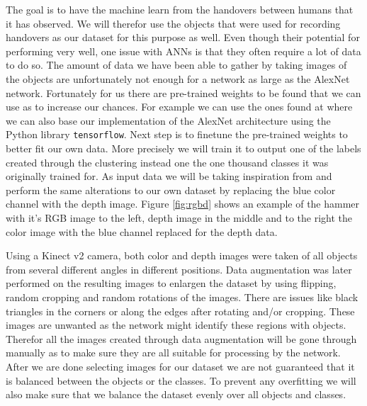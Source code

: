 The goal is to have the machine learn from the handovers between humans that it has observed. We will therefor use the objects that were used for recording handovers as our dataset for this purpose as well. Even though their potential for performing very well, one issue with ANNs is that they often require a lot of data to do so. The amount of data we have been able to gather by taking images of the objects are unfortunately not enough for a network as large as the AlexNet network. Fortunately for us there are pre-trained weights to be found that we can use as to increase our chances. For example we can use the ones found at \parencite{AlexNetImplWeights} where we can also base our implementation of the AlexNet architecture using the Python library \texttt{tensorflow}.  Next step is to finetune the pre-trained weights to better fit our own data. More precisely we will train it to output one of the labels created through the clustering instead one the one thousand classes it was originally trained for. As input data we will be taking inspiration from \parencite{Redmon2014} and perform the same alterations to our own dataset by replacing the blue color channel with the depth image. Figure \ref{fig:rgbd} shows an example of the hammer with it's RGB image to the left, depth image in the middle and to the right the color image with the blue channel replaced for the depth data.

Using a Kinect v2 camera, both color and depth images were taken of all objects from several different angles in different positions. Data augmentation was later performed on the resulting images to enlargen the dataset by using flipping, random cropping and random rotations of the images. There are issues like black triangles in the corners or along the edges after rotating and/or cropping. These images are unwanted as the network might identify these regions with objects. Therefor all the images created through data augmentation will be gone through manually as to make sure they are all suitable for processing by the network. After we are done selecting images for our dataset we are not guaranteed that it is balanced between the objects or the classes. To prevent any overfitting we will also make sure that we balance the dataset evenly over all objects and classes.

